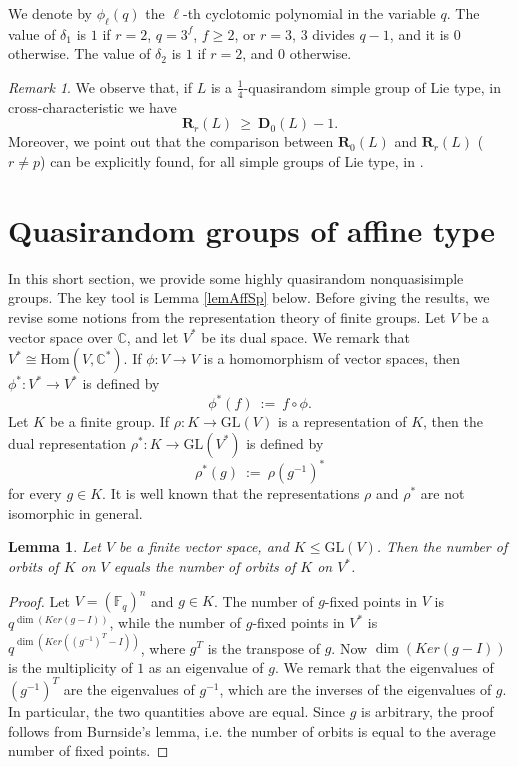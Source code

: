 \documentclass{daj}
\newtheorem{lemma}[theorem]{Lemma}
\theoremstyle{definition}
\theoremstyle{remark}
\newtheorem{remark}[theorem]{Remark}
\newcommand{\GL}{\mathrm{GL}}
\newcommand{\D}{\mathbf{D}}
\newcommand{\Di}{\mathbf{R}}
\begin{document}
	
    We denote by $\phi_\ell(q)$ the $\ell$-th cyclotomic polynomial in the variable $q$.
	The value of $\delta_1$ is $1$ if $r=2$, $q=3^f$, $f\geq 2$, or $r=3$, $3$ divides $q-1$, and it is $0$ otherwise.
	The value of $\delta_2$ is $1$ if $r=2$, and $0$ otherwise.
	
	\begin{remark} \label{rem14simple} 
	We observe that, if $L$ is a $\frac{1}{4}$-quasirandom simple group of Lie type, in cross-characteristic we have
	$$ \Di_r(L) \> \geq \> \D_0(L) -1 . $$
	Moreover, we point out that the comparison between $\Di_0(L)$ and $\Di_r(L)$ ($r \neq p$) can be explicitly found,
	for all simple groups of Lie type, in \cite[Sec. 3]{Tie03}.
\end{remark} 













\section{Quasirandom groups of affine type} \label{sec3} 

In this short section, we provide some highly quasirandom nonquasisimple groups.
The key tool is Lemma \ref{lemAffSp} below.
Before giving the results, we revise some notions from the representation theory of finite groups.
Let $V$ be a vector space over $\mathbb{C}$, and let $V^*$ be its dual space.
We remark that $V^* \cong \mathrm{Hom}(V,\mathbb{C}^*)$.
If $\phi \colon V \rightarrow V$ is a homomorphism of vector spaces, then $\phi^* \colon V^* \rightarrow V^*$ is defined by
$$ \phi^* (f) \> := \> f \circ \phi . $$
Let $K$ be a finite group.
If $\rho \colon K \rightarrow \GL(V)$ is a representation of $K$,
then the dual representation $\rho^* \colon K \rightarrow \GL(V^*)$ is defined by
$$ \rho^*(g) \> := \> \rho(g^{-1})^* $$
for every $g \in K$.
It is well known that the representations $\rho$ and $\rho^*$ are not isomorphic in general.

\begin{lemma} \label{lemAffKey} 
	Let $V$ be a finite vector space, and $K \leqslant \GL(V)$.
	Then the number of orbits of $K$ on $V$ equals the number of orbits of $K$ on $V^*$.
\end{lemma}
\begin{proof}
Let $V=(\mathbb{F}_q)^n$ and $g \in K$.
The number of $g$-fixed points in $V$ is $q^{\dim(Ker(g-I))}$,
while the number of $g$-fixed points in $V^*$ is $q^{\dim(Ker((g^{-1})^T-I))}$,
where $g^T$ is the transpose of $g$.
Now $\dim(Ker(g-I))$ is the multiplicity of $1$ as an eigenvalue of $g$.
We remark that the eigenvalues of $(g^{-1})^T$ are the eigenvalues of $g^{-1}$,
which are the inverses of the eigenvalues of $g$.
In particular, the two quantities above are equal.
Since $g$ is arbitrary, the proof follows from Burnside's lemma,
i.e. the number of orbits is equal to the average number of fixed points.
\end{proof} 
\end{document}
